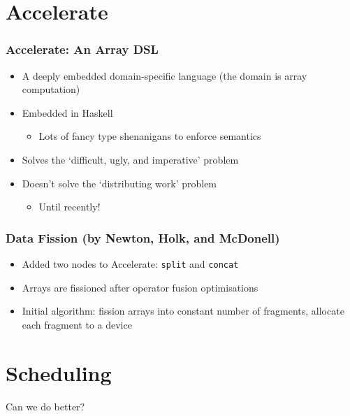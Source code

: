 \documentclass{beamer}
\begin{document}
\section{Accelerate}

\begin{frame}
\frametitle{Accelerate: An Array DSL}
\begin{itemize}
  \item A deeply embedded domain-specific language (the domain is array computation)
  \item Embedded in Haskell
    \begin{itemize}
      \item Lots of fancy type shenanigans to enforce semantics
    \end{itemize}
  \item Solves the `difficult, ugly, and imperative' problem
  \item Doesn't solve the `distributing work' problem
    \begin{itemize}
      \item Until recently!
    \end{itemize}
\end{itemize}
\end{frame}

\begin{frame}
\frametitle{Data Fission (by Newton, Holk, and McDonell)}
\begin{itemize}
  \item Added two nodes to Accelerate: \texttt{split} and \texttt{concat}
  \item Arrays are fissioned after operator fusion optimisations
  \item Initial algorithm: fission arrays into constant number of fragments, allocate each fragment to a device
\end{itemize}
\end{frame}

\section{Scheduling}

\begin{frame}
\Huge{\centerline{Can we do better?}}
\end{frame}
\end{document}
